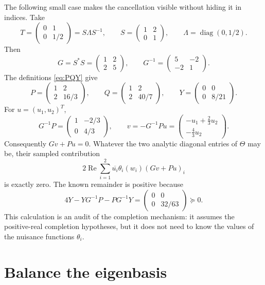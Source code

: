 \documentclass[11pt,oneside,openany]{book}
\theoremstyle{definition}
\theoremstyle{remark}
\newcommand{\diag}{\operatorname{diag}}
\newcommand{\RePart}{\operatorname{Re}}
\begin{document}
The following small case makes the cancellation visible without
hiding it in indices.  Take
\[
  T=\begin{pmatrix}0&1\\0&1/2\end{pmatrix}
  =S\Lambda S^{-1},
  \qquad
  S=\begin{pmatrix}1&2\\0&1\end{pmatrix},
  \qquad
  \Lambda=\diag(0,1/2).
\]
Then
\[
  G=S^*S=\begin{pmatrix}1&2\\2&5\end{pmatrix},
  \qquad
  G^{-1}=\begin{pmatrix}5&-2\\-2&1\end{pmatrix}.
\]
The definitions \eqref{eq:PQY} give
\[
  P=\begin{pmatrix}1&2\\2&16/3\end{pmatrix},
  \qquad
  Q=\begin{pmatrix}1&2\\2&40/7\end{pmatrix},
  \qquad
  Y=\begin{pmatrix}0&0\\0&8/21\end{pmatrix}.
\]
For \(u=(u_1,u_2)^T\),
\[
  G^{-1}P=
  \begin{pmatrix}1&-2/3\\0&4/3\end{pmatrix},
  \qquad
  v=-G^{-1}Pu
  =\begin{pmatrix}-u_1+\tfrac23u_2\\-\tfrac43u_2\end{pmatrix}.
\]
Consequently \(Gv+Pu=0\).  Whatever the two analytic diagonal entries
of \(\Theta\) may be, their sampled contribution
\[
  2\RePart\sum_{i=1}^2
  \overline{u_i}\theta_i(w_i)(Gv+Pu)_i
\]
is exactly zero.  The known remainder is positive because
\[
  4Y-YG^{-1}P-PG^{-1}Y
  =\begin{pmatrix}0&0\\0&32/63\end{pmatrix}\succeq0.
\]
This calculation is an audit of the completion mechanism: it assumes
the positive-real completion hypotheses, but it does not need to know
the values of the nuisance functions \(\theta_i\).

\section{Balance the eigenbasis}
\end{document}
